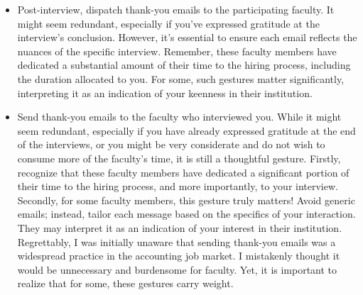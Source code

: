 \documentclass[12pt]{article}
\begin{document}
\begin{itemize}
\item Post-interview, dispatch thank-you emails to the participating faculty. It might seem redundant, especially if you've expressed gratitude at the interview's conclusion. However, it's essential to ensure each email reflects the nuances of the specific interview. Remember, these faculty members have dedicated a substantial amount of their time to the hiring process, including the duration allocated to you. For some, such gestures matter significantly, interpreting it as an indication of your keenness in their institution.
\item Send thank-you emails to the faculty who interviewed you. While it might seem redundant, especially if you have already expressed gratitude at the end of the interviews, or you might be very considerate and do not wish to consume more of the faculty's time, it is still a thoughtful gesture. Firstly, recognize that these faculty members have dedicated a significant portion of their time to the hiring process, and more importantly, to your interview. Secondly, for some faculty members, this gesture truly matters! Avoid generic emails; instead, tailor each message based on the specifics of your interaction. They may interpret it as an indication of your interest in their institution. Regrettably, I was initially unaware that sending thank-you emails was a widespread practice in the accounting job market. I mistakenly thought it would be unnecessary and burdensome for faculty. Yet, it is important to realize that for some, these gestures carry weight.
\end{itemize}
\end{document}
